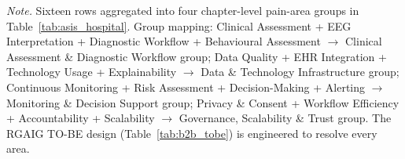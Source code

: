 \vspace{0.4em}
\noindent\textit{Note.} Sixteen rows aggregated into four chapter-level pain-area groups in Table~\ref{tab:asis_hospital}. Group mapping: Clinical Assessment + EEG Interpretation + Diagnostic Workflow + Behavioural Assessment $\to$ Clinical Assessment \& Diagnostic Workflow group; Data Quality + EHR Integration + Technology Usage + Explainability $\to$ Data \& Technology Infrastructure group; Continuous Monitoring + Risk Assessment + Decision-Making + Alerting $\to$ Monitoring \& Decision Support group; Privacy \& Consent + Workflow Efficiency + Accountability + Scalability $\to$ Governance, Scalability \& Trust group. The RGAIG TO-BE design (Table~\ref{tab:b2b_tobe}) is engineered to resolve every area.
